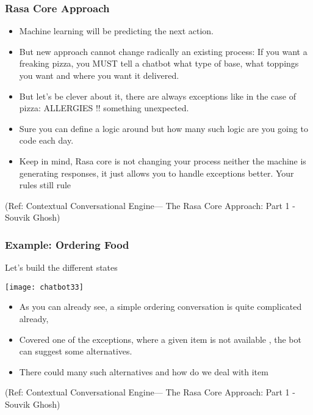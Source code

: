  \begin{frame}[fragile]\frametitle{Rasa Core Approach}
\begin{itemize}
\item Machine learning will be predicting the next action.
\item But new approach cannot change radically an existing process: If you want a freaking pizza, you MUST tell a chatbot what type of base, what toppings you want and where you want it delivered.
\item 
But let’s be clever about it, there are always exceptions like in the case of pizza: ALLERGIES !! something unexpected. 
\item Sure you can define a logic around but how many such logic are you going to code each day.
\item Keep in mind, Rasa core is not changing your process neither the machine is generating responses, it just allows you to handle exceptions better. Your rules still rule
\end{itemize}

\tiny{(Ref: Contextual Conversational Engine— The Rasa Core Approach: Part 1 - Souvik Ghosh)}

\end{frame}

 \begin{frame}[fragile]\frametitle{Example: Ordering Food}
 
 Let’s build the different states
 
\begin{center}
\texttt{[image: chatbot33]}

\end{center}

\begin{itemize}
\item As you can already see, a simple ordering conversation is quite complicated already, 
\item Covered one of the exceptions, where a given item is not available , the bot can suggest some alternatives. 
\item There could many such alternatives and how do we deal with item
\end{itemize}


\tiny{(Ref: Contextual Conversational Engine— The Rasa Core Approach: Part 1 - Souvik Ghosh)}

\end{frame}

